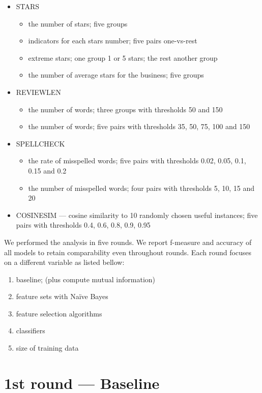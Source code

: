 \begin{itemize}
	\item STARS 
		\begin{itemize}
			\item the number of stars; five groups
			\item indicators for each stars number; five pairs one-vs-rest
			\item extreme stars; one group 1 or 5 stars; the rest another group
			\item the number of average stars for the business; five groups
		\end{itemize}
	\item REVIEWLEN 
		\begin{itemize}
			\item the number of words; three groups with thresholds 50 and 150
			\item the number of words; five pairs with thresholds 35, 50, 75, 100 and 150
		\end{itemize}
	\item SPELLCHECK 
		\begin{itemize}
			\item the rate of misspelled words; five pairs with thresholds 0.02, 0.05, 0.1, 0.15 and 0.2
			\item the number of misspelled words; four pairs with thresholds 5, 10, 15 and 20
		\end{itemize}
	
	\item COSINESIM --- cosine similarity to 10 randomly chosen useful instances; five pairs with thresholds 0.4, 0.6, 0.8, 0.9, 0.95
\end{itemize}

We performed the analysis in five rounds.
We report f-measure and accuracy of all models to retain comparability even throughout rounds.
Each round focuses on a different variable as listed bellow:

\begin{enumerate}
	\item baseline; (plus compute mutual information)
	\item feature sets with Na\"{i}ve Bayes
	\item feature selection algorithms
	\item classifiers
	\item size of training data
\end{enumerate}


\section{1st round --- Baseline}

